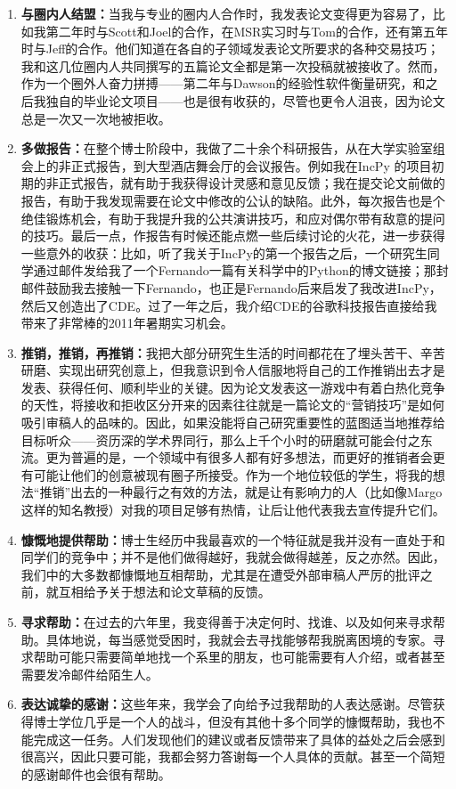 \documentclass[letter,12pt]{book}
\begin{document}
\begin{CJK}{UTF8}{gbsn}
\begin{enumerate}
  \item \textbf{与圈内人结盟：}当我与专业的圈内人合作时，我发表论文变得更为容易了，比如我第二年时与Scott和Joel的合作，在MSR实习时与Tom的合作，还有第五年时与Jeff的合作。他们知道在各自的子领域发表论文所要求的各种交易技巧；我和这几位圈内人共同撰写的五篇论文全都是第一次投稿就被接收了。然而，作为一个圈外人奋力拼搏——第二年与Dawson的经验性软件衡量研究，和之后我独自的毕业论文项目——也是很有收获的，尽管也更令人沮丧，因为论文总是一次又一次地被拒收。
  \item \textbf{多做报告：}在整个博士阶段中，我做了二十余个科研报告，从在大学实验室组会上的非正式报告，到大型酒店舞会厅的会议报告。例如我在IncPy 的项目初期的非正式报告，就有助于我获得设计灵感和意见反馈；我在提交论文前做的报告，有助于我发现需要在论文中修改的公认的缺陷。此外，每次报告也是个绝佳锻炼机会，有助于我提升我的公共演讲技巧，和应对偶尔带有敌意的提问的技巧。最后一点，作报告有时候还能点燃一些后续讨论的火花，进一步获得一些意外的收获：比如，听了我关于IncPy的第一个报告之后，一个研究生同学通过邮件发给我了一个Fernando一篇有关科学中的Python的博文链接；那封邮件鼓励我去接触一下Fernando，也正是Fernando后来启发了我改进IncPy，然后又创造出了CDE。过了一年之后，我介绍CDE的谷歌科技报告直接给我带来了非常棒的2011年暑期实习机会。
  \item \textbf{推销，推销，再推销：}我把大部分研究生生活的时间都花在了埋头苦干、辛苦研磨、实现出研究创意上，但我意识到令人信服地将自己的工作推销出去才是发表、获得任何、顺利毕业的关键。因为论文发表这一游戏中有着白热化竞争的天性，将接收和拒收区分开来的因素往往就是一篇论文的“营销技巧”是如何吸引审稿人的品味的。因此，如果没能将自己研究重要性的蓝图适当地推荐给目标听众——资历深的学术界同行，那么上千个小时的研磨就可能会付之东流。更为普遍的是，一个领域中有很多人都有好多想法，而更好的推销者会更有可能让他们的创意被现有圈子所接受。作为一个地位较低的学生，将我的想法“推销”出去的一种最行之有效的方法，就是让有影响力的人（比如像Margo 这样的知名教授）对我的项目足够有热情，让后让他代表我去宣传提升它们。
  \item \textbf{慷慨地提供帮助：}博士生经历中我最喜欢的一个特征就是我并没有一直处于和同学们的竞争中；并不是他们做得越好，我就会做得越差，反之亦然。因此，我们中的大多数都慷慨地互相帮助，尤其是在遭受外部审稿人严厉的批评之前，就互相给予关于想法和论文草稿的反馈。
  \item \textbf{寻求帮助：}在过去的六年里，我变得善于决定何时、找谁、以及如何来寻求帮助。具体地说，每当感觉受困时，我就会去寻找能够帮我脱离困境的专家。寻求帮助可能只需要简单地找一个系里的朋友，也可能需要有人介绍，或者甚至需要发冷邮件给陌生人。
  \item \textbf{表达诚挚的感谢：}这些年来，我学会了向给予过我帮助的人表达感谢。尽管获得博士学位几乎是一个人的战斗，但没有其他十多个同学的慷慨帮助，我也不能完成这一任务。人们发现他们的建议或者反馈带来了具体的益处之后会感到很高兴，因此只要可能，我都会努力答谢每一个人具体的贡献。甚至一个简短的感谢邮件也会很有帮助。

\end{enumerate}
\end{CJK}
\end{document}
